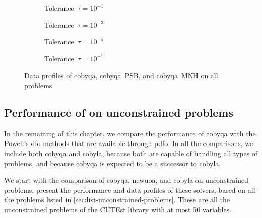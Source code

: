 \begin{figure}[ht]
    \centering
    \begin{subfigure}[b]{0.49\textwidth}
        \centering
        \caption{Tolerance~$\tau = 10^{-1}$}
    \end{subfigure}
    \hfill
    \begin{subfigure}[b]{0.49\textwidth}
        \centering
        \caption{Tolerance~$\tau = 10^{-3}$}
    \end{subfigure}
    \begin{subfigure}[b]{0.49\textwidth}
        \centering
        \caption{Tolerance~$\tau = 10^{-5}$}
    \end{subfigure}
    \hfill
    \begin{subfigure}[b]{0.49\textwidth}
        \centering
        \caption{Tolerance~$\tau = 10^{-7}$}
    \end{subfigure}
    \caption[Data profiles with different models]{Data profiles of \gls{cobyqa}, \gls{cobyqa}~PSB, and \gls{cobyqa}~MNH on all problems}
    \label{fig:data-models}
\end{figure}

\subsection{Performance of  on unconstrained problems}
\label{subsec:perf-cobyqa-unconstrained-problems}

In the remaining of this chapter, we compare the performance of \gls{cobyqa} with the Powell's \gls{dfo} methods that are available through \gls{pdfo}.
In all the comparisons, we include both \gls{cobyqa} and \gls{cobyla}, because both are capable of handling all types of problems, and because \gls{cobyqa} is expected to be a successor to \gls{cobyla}.

We start with the comparison of \gls{cobyqa}, \gls{newuoa}, and \gls{cobyla} on unconstrained problems.
 present the performance and data profiles of these solvers, based on all the problems listed in \cref{sec:list-unconstrained-problems}.
These are all the unconstrained problems of the CUTEst library with at most \num{50} variables.

